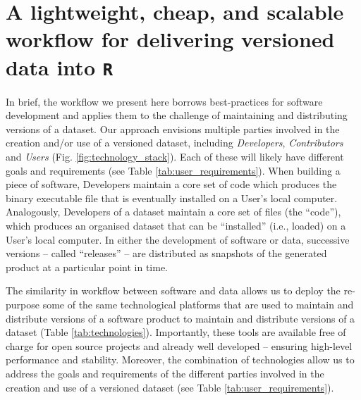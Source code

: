 \documentclass[a4paper,num-refs]{assets/oup-contemporary}
\begin{document}
\section{A lightweight, cheap, and scalable workflow for delivering versioned data into \texttt{R}}

In brief, the workflow we present here borrows best-practices for software development \cite{Perez-Riverol-2016} and applies them to the challenge of maintaining and distributing versions of a dataset. Our approach envisions multiple parties involved in the creation and/or use of a versioned dataset, including \emph{Developers}, \emph{Contributors} and \emph{Users} (Fig. \ref{fig:technology_stack}). Each of these will likely have different goals and requirements (see Table \ref{tab:user_requirements}). When building a piece of software, Developers maintain a core set of code which produces the binary executable file that is eventually installed on a User's local computer. Analogously, Developers of a dataset maintain a core set of files (the ``code''), which produces an organised dataset that can be ``installed'' (i.e., loaded) on a User's local computer. In either the development of software or data, successive versions -- called ``releases'' -- are distributed as snapshots of the generated product at a particular point in time. 

The similarity in workflow between software and data allows us to deploy the re-purpose some of the same technological platforms that are used to maintain and distribute versions of a software product to maintain and distribute versions of a dataset (Table \ref{tab:technologies}). Importantly, these tools are available free of charge for open source projects and already well developed -- ensuring high-level performance and stability. Moreover, the combination of technologies allow us to address the goals and requirements of the different parties involved in the creation and use of a versioned dataset (see Table \ref{tab:user_requirements}). 
\end{document}
